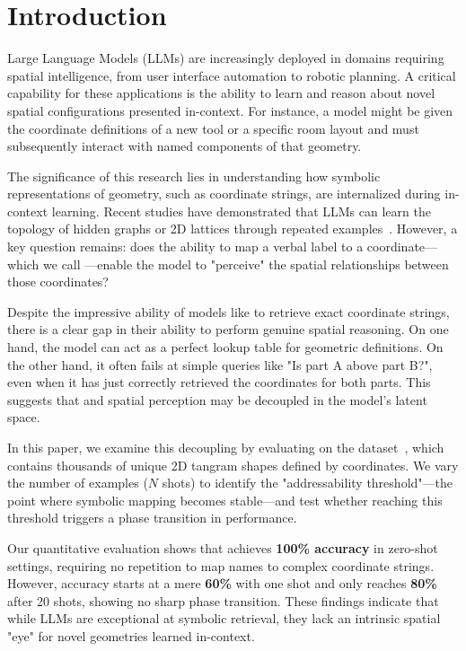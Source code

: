 \section{Introduction}
\label{sec:intro}

Large Language Models (LLMs) are increasingly deployed in domains requiring spatial intelligence, from user interface automation to robotic planning. A critical capability for these applications is the ability to learn and reason about novel spatial configurations presented in-context. For instance, a model might be given the coordinate definitions of a new tool or a specific room layout and must subsequently interact with named components of that geometry.

The significance of this research lies in understanding how symbolic representations of geometry, such as \svg coordinate strings, are internalized during in-context learning. Recent studies have demonstrated that LLMs can learn the topology of hidden graphs or 2D lattices through repeated examples~\cite{tang2026concept, xiong2026lattice}. However, a key question remains: does the ability to map a verbal label to a coordinate—which we call \textbf{\addressing}—enable the model to "perceive" the spatial relationships between those coordinates?

Despite the impressive ability of models like \gpt to retrieve exact coordinate strings, there is a clear gap in their ability to perform genuine spatial reasoning. On one hand, the model can act as a perfect lookup table for geometric definitions. On the other hand, it often fails at simple queries like "Is part A above part B?", even when it has just correctly retrieved the coordinates for both parts. This suggests that \addressing and spatial perception may be decoupled in the model's latent space.

In this paper, we examine this decoupling by evaluating \gpt on the \kilogram dataset~\cite{ji2022kilogram}, which contains thousands of unique 2D tangram shapes defined by \svg coordinates. We vary the number of examples ($N$ shots) to identify the "addressability threshold"—the point where symbolic mapping becomes stable—and test whether reaching this threshold triggers a phase transition in \reasoning performance.

Our quantitative evaluation shows that \gpt achieves {\bf 100\% \addressing accuracy} in zero-shot settings, requiring no repetition to map names to complex coordinate strings. However, \reasoning accuracy starts at a mere {\bf 60\%} with one shot and only reaches {\bf 80\%} after 20 shots, showing no sharp phase transition. These findings indicate that while LLMs are exceptional at symbolic retrieval, they lack an intrinsic spatial "eye" for novel geometries learned in-context.

